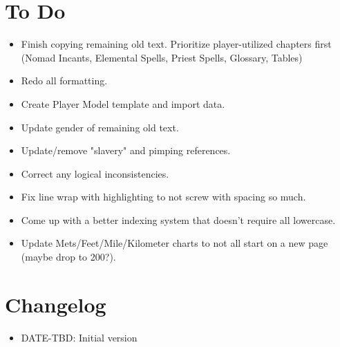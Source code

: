 \section{To Do}
\begin{itemize}
	\item Finish copying remaining old text. Prioritize player-utilized chapters first (Nomad Incants, Elemental Spells, Priest Spells, Glossary, Tables)
	\item Redo all formatting.
	\item Create Player Model template and import data.
	\item Update gender of remaining old text.
	\item Update/remove "slavery" and pimping references.
	\item Correct any logical inconsistencies.
	\item Fix line wrap with highlighting to not screw with spacing so much.
	\item Come up with a better indexing system that doesn't require all lowercase.
	\item Update Mets/Feet/Mile/Kilometer charts to not all start on a new page (maybe drop to 200?).
\end{itemize}
\section{Changelog}
\begin{itemize}[leftmargin=12pt]
\item DATE-TBD: Initial version
\end{itemize}
